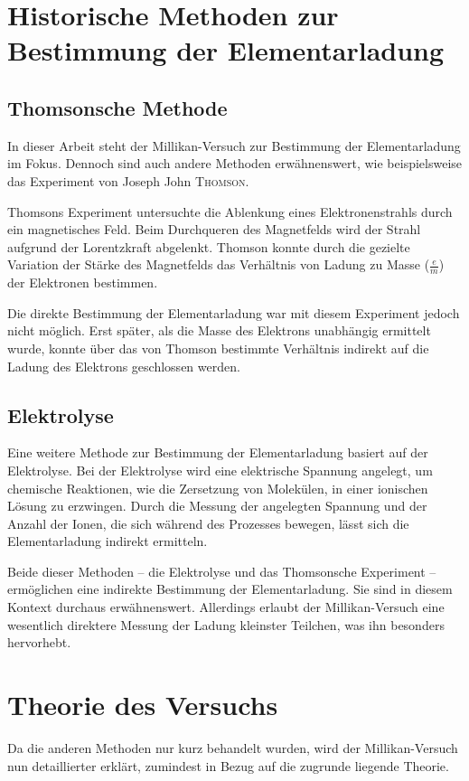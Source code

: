 \section[Historische Methoden]{Historische Methoden zur Bestimmung der Elementarladung}
\subsection{Thomsonsche Methode}\label{sub:thomson}
In dieser Arbeit steht der Millikan-Versuch zur Bestimmung der Elementarladung im Fokus. Dennoch sind auch andere Methoden erwähnenswert, wie beispielsweise das Experiment von Joseph John {\scshape Thomson}.

Thomsons Experiment untersuchte die Ablenkung eines Elektronenstrahls durch ein magnetisches Feld. Beim Durchqueren des Magnetfelds wird der Strahl aufgrund der Lorentzkraft abgelenkt. Thomson konnte durch die gezielte Variation der Stärke des Magnetfelds das Verhältnis von Ladung zu Masse ($\frac{e}{m}$) der Elektronen bestimmen.

Die direkte Bestimmung der Elementarladung war mit diesem Experiment jedoch nicht möglich. Erst später, als die Masse des Elektrons unabhängig ermittelt wurde, konnte über das von Thomson bestimmte Verhältnis indirekt auf die Ladung des Elektrons geschlossen werden.

\subsection{Elektrolyse}\label{sub:elektrolyse}
Eine weitere Methode zur Bestimmung der Elementarladung basiert auf der Elektrolyse. Bei der Elektrolyse wird eine elektrische Spannung angelegt, um chemische Reaktionen, wie die Zersetzung von Molekülen, in einer ionischen Lösung zu erzwingen. Durch die Messung der angelegten Spannung und der Anzahl der Ionen, die sich während des Prozesses bewegen, lässt sich die Elementarladung indirekt ermitteln.

Beide dieser Methoden – die Elektrolyse und das Thomsonsche Experiment – ermöglichen eine indirekte Bestimmung der Elementarladung. Sie sind in diesem Kontext durchaus erwähnenswert. Allerdings erlaubt der Millikan-Versuch eine wesentlich direktere Messung der Ladung kleinster Teilchen, was ihn besonders hervorhebt.


\section{Theorie des Versuchs}\label{sec:versuchsTheorie}
Da die anderen Methoden nur kurz behandelt wurden, wird der Millikan-Versuch nun detaillierter erklärt, zumindest in Bezug auf die zugrunde liegende Theorie.\\

